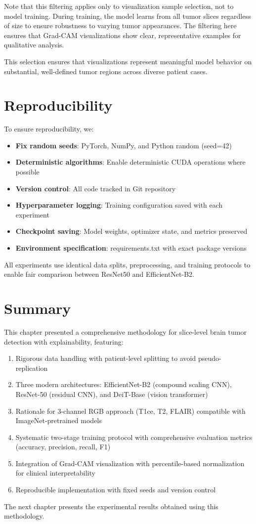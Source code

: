 Note that this filtering applies only to visualization sample selection, not to model training. During training, the model learns from all tumor slices regardless of size to ensure robustness to varying tumor appearances. The filtering here ensures that Grad-CAM visualizations show clear, representative examples for qualitative analysis.

This selection ensures that visualizations represent meaningful model behavior on substantial, well-defined tumor regions across diverse patient cases.

\section{Reproducibility}

To ensure reproducibility, we:

\begin{itemize}
    \item \textbf{Fix random seeds}: PyTorch, NumPy, and Python random (seed=42)
    \item \textbf{Deterministic algorithms}: Enable deterministic CUDA operations where possible
    \item \textbf{Version control}: All code tracked in Git repository
    \item \textbf{Hyperparameter logging}: Training configuration saved with each experiment
    \item \textbf{Checkpoint saving}: Model weights, optimizer state, and metrics preserved
    \item \textbf{Environment specification}: requirements.txt with exact package versions
\end{itemize}

All experiments use identical data splits, preprocessing, and training protocols to enable fair comparison between ResNet50 and EfficientNet-B2.

\section{Summary}

This chapter presented a comprehensive methodology for slice-level brain tumor detection with explainability, featuring:
\begin{enumerate}
    \item Rigorous data handling with patient-level splitting to avoid pseudo-replication
    \item Three modern architectures: EfficientNet-B2 (compound scaling CNN), ResNet-50 (residual CNN), and DeiT-Base (vision transformer)
    \item Rationale for 3-channel RGB approach (T1ce, T2, FLAIR) compatible with ImageNet-pretrained models
    \item Systematic two-stage training protocol with comprehensive evaluation metrics (accuracy, precision, recall, F1)
    \item Integration of Grad-CAM visualization with percentile-based normalization for clinical interpretability
    \item Reproducible implementation with fixed seeds and version control
\end{enumerate}

The next chapter presents the experimental results obtained using this methodology.
